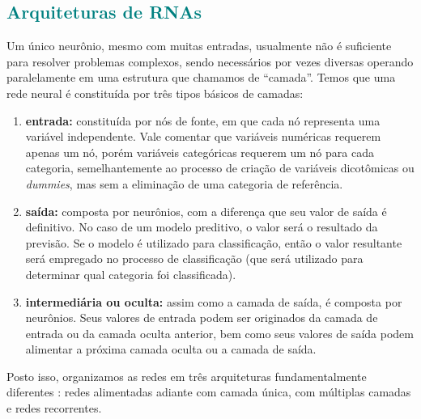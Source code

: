 \documentclass{automatextcc}
\newcommand{\nico}[1]{\textcolor{teal}{#1}}
\begin{document}
\subsection{\nico{Arquiteturas de RNAs}}
Um único neurônio, mesmo com muitas entradas, usualmente não é suficiente para resolver problemas complexos, sendo necessários por vezes diversas operando paralelamente em uma estrutura que chamamos de ``camada''. Temos que uma rede neural é constituída por três tipos básicos de camadas:

\begin{enumerate}
    \item \textbf{entrada:} constituída por nós de fonte, em que cada nó representa uma variável independente. Vale comentar que variáveis numéricas requerem apenas um nó, porém variáveis categóricas requerem um nó para cada categoria, semelhantemente ao processo de criação de variáveis dicotômicas ou \textit{dummies}, mas sem a eliminação de uma categoria de referência.
    \item \textbf{saída:} composta por neurônios, com a diferença que seu valor de saída é definitivo. No caso de um modelo preditivo, o valor será o resultado da previsão. Se o modelo é utilizado para classificação, então o valor resultante será empregado no processo de classificação (que será utilizado para determinar qual categoria foi classificada).
    \item \textbf{intermediária ou oculta:} assim como a camada de saída, é composta por neurônios. Seus valores de entrada podem ser originados da camada de entrada ou da camada oculta anterior, bem como seus valores de saída podem alimentar a próxima camada oculta ou a camada de saída.
\end{enumerate}
Posto isso, organizamos as redes em três arquiteturas fundamentalmente diferentes \citep{hair2005,haykin2009,hagan2014}: redes alimentadas adiante com camada única, com múltiplas camadas e redes recorrentes.



\end{document}
